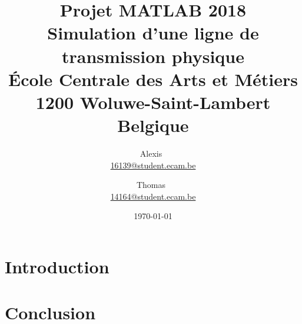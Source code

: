 \documentclass[10pt, oneside, a4paper]{article}
\date{%
        \today
    }
\author{%
        Alexis~\bsc{Nootens} \\
        \href{mailto:16139@student.ecam.be}{16139@student.ecam.be}
        \and
        Thomas~\bsc{Anizet} \\
        \href{mailto:14164@student.ecam.be}{14164@student.ecam.be}
    }
\title{%
        \color{gray}\LARGE\bfseries\sffamily
        Projet MATLAB\textregistered{} 2018             \\[3mm]
        \rm\sffamily\large
        Simulation d'une ligne de transmission physique \\[7mm]
        École Centrale des Arts et Métiers 		        \\
        1200 Woluwe-Saint-Lambert				        \\
        Belgique
    }
\begin{document}
\maketitle

\section*{Introduction}
\section*{Conclusion}
\end{document}
